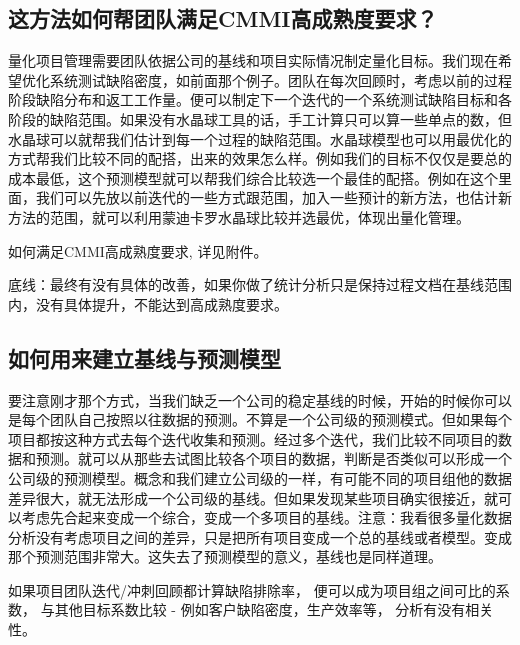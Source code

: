 \hypertarget{ux8fd9ux65b9ux6cd5ux5982ux4f55ux5e2eux56e2ux961fux6ee1ux8db3cmmiux9ad8ux6210ux719fux5ea6ux8981ux6c42}{%
\subsection{这方法如何帮团队满足CMMI高成熟度要求？}\label{ux8fd9ux65b9ux6cd5ux5982ux4f55ux5e2eux56e2ux961fux6ee1ux8db3cmmiux9ad8ux6210ux719fux5ea6ux8981ux6c42}}

量化项目管理需要团队依据公司的基线和项目实际情况制定量化目标。我们现在希望优化系统测试缺陷密度，如前面那个例子。团队在每次回顾时，考虑以前的过程阶段缺陷分布和返工工作量。便可以制定下一个迭代的一个系统测试缺陷目标和各阶段的缺陷范围。如果没有水晶球工具的话，手工计算只可以算一些单点的数，但水晶球可以就帮我们估计到每一个过程的缺陷范围。水晶球模型也可以用最优化的方式帮我们比较不同的配搭，出来的效果怎么样。例如我们的目标不仅仅是要总的成本最低，这个预测模型就可以帮我们综合比较选一个最佳的配搭。例如在这个里面，我们可以先放以前迭代的一些方式跟范围，加入一些预计的新方法，也估计新方法的范围，就可以利用蒙迪卡罗水晶球比较并选最优，体现出量化管理。

如何满足CMMI高成熟度要求, 详见附件。

底线：最终有没有具体的改善，如果你做了统计分析只是保持过程文档在基线范围内，没有具体提升，不能达到高成熟度要求。

\hypertarget{ux5982ux4f55ux7528ux6765ux5efaux7acbux57faux7ebfux4e0eux9884ux6d4bux6a21ux578b}{%
\subsection{如何用来建立基线与预测模型}\label{ux5982ux4f55ux7528ux6765ux5efaux7acbux57faux7ebfux4e0eux9884ux6d4bux6a21ux578b}}

要注意刚才那个方式，当我们缺乏一个公司的稳定基线的时候，开始的时候你可以是每个团队自己按照以往数据的预测。不算是一个公司级的预测模式。但如果每个项目都按这种方式去每个迭代收集和预测。经过多个迭代，我们比较不同项目的数据和预测。就可以从那些去试图比较各个项目的数据，判断是否类似可以形成一个公司级的预测模型。概念和我们建立公司级的一样，有可能不同的项目组他的数据差异很大，就无法形成一个公司级的基线。但如果发现某些项目确实很接近，就可以考虑先合起来变成一个综合，变成一个多项目的基线。注意：我看很多量化数据分析没有考虑项目之间的差异，只是把所有项目变成一个总的基线或者模型。变成那个预测范围非常大。这失去了预测模型的意义，基线也是同样道理。

如果项目团队迭代/冲刺回顾都计算缺陷排除率，
便可以成为项目组之间可比的系数， 与其他目标系数比较 -
例如客户缺陷密度，生产效率等， 分析有没有相关性。

